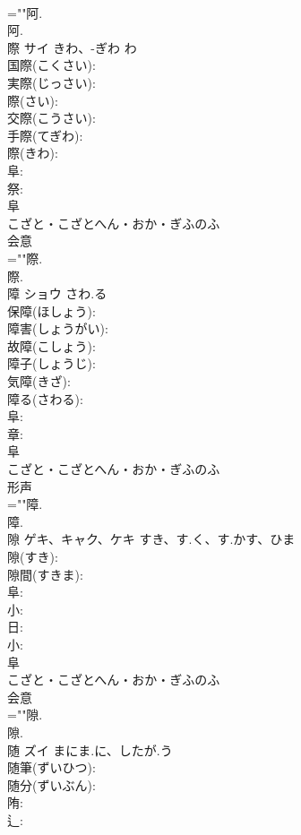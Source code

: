 \documentclass[8pt]{extreport}
\begin{document}
\begin{CJK}{UTF8}{min}
\\	=""阿.
\\	阿.
\\	際	サイ	きわ、-ぎわ	わ	
\\	国際(こくさい): 
\\	実際(じっさい): 
\\	際(さい): 
\\	交際(こうさい): 
\\	手際(てぎわ): 
\\	際(きわ): 
\\	阜: 
\\	祭: 
\\	阜	
\\	こざと・こざとへん・おか・ぎふのふ	
\\	会意 
\\	=""際.
\\	際.
\\	障	ショウ	さわ.る		
\\	保障(ほしょう): 
\\	障害(しょうがい): 
\\	故障(こしょう): 
\\	障子(しょうじ): 
\\	気障(きざ): 
\\	障る(さわる): 
\\	阜: 
\\	章: 
\\	阜	
\\	こざと・こざとへん・おか・ぎふのふ	
\\	形声 
\\	=""障.
\\	障.
\\	隙	ゲキ、キャク、ケキ	すき、す.く、す.かす、ひま		
\\	隙(すき): 
\\	隙間(すきま): 
\\	阜: 
\\	小: 
\\	日: 
\\	小: 
\\	阜	
\\	こざと・こざとへん・おか・ぎふのふ	
\\	会意 
\\	=""隙.
\\	隙.
\\	随	ズイ	まにま.に、したが.う		
\\	随筆(ずいひつ): 
\\	随分(ずいぶん): 
\\	陏: 
\\	辶: 

\end{CJK}
\end{document}
